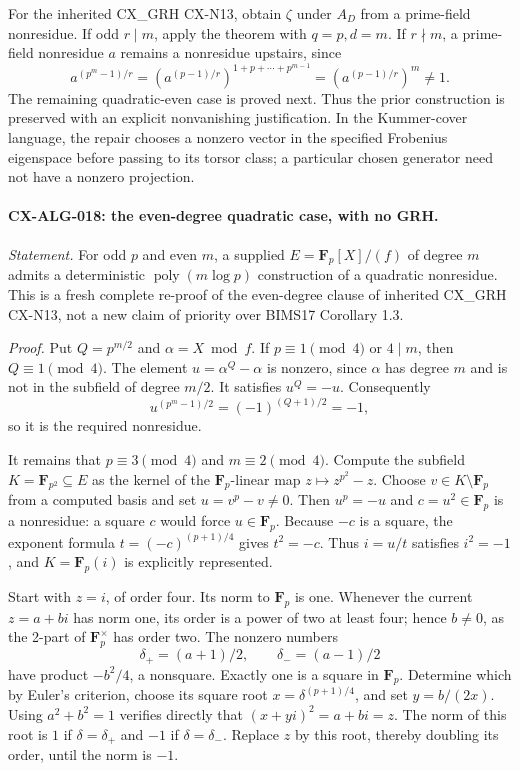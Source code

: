 \documentclass[11pt,a4paper]{article}
\begin{document}
For the inherited CX\_GRH CX-N13, obtain $\zeta$ under $A_D$ from a
prime-field nonresidue. If odd $r\mid m$, apply the theorem with
$q=p,d=m$. If $r\nmid m$, a prime-field nonresidue $a$ remains a
nonresidue upstairs, since
\[
 a^{(p^m-1)/r}
   =\left(a^{(p-1)/r}\right)^{1+p+\cdots+p^{m-1}}
   =\left(a^{(p-1)/r}\right)^m\ne1.
\]
The remaining quadratic-even case is proved next. Thus the prior
construction is preserved with an explicit nonvanishing justification.
In the Kummer-cover language, the repair chooses a nonzero vector in the
specified Frobenius eigenspace before passing to its torsor class; a
particular chosen generator need not have a nonzero projection.

\paragraph{CX-ALG-018: the even-degree quadratic case, with no GRH.}
\emph{Statement.} For odd $p$ and even $m$, a supplied
$E=\mathbf F_p[X]/(f)$ of degree $m$ admits a deterministic
$\operatorname{poly}(m\log p)$ construction of a quadratic nonresidue.
This is a fresh complete re-proof of the even-degree clause of inherited
CX\_GRH CX-N13, not a new claim of priority over BIMS17 Corollary 1.3.

\emph{Proof.} Put $Q=p^{m/2}$ and $\alpha=X\bmod f$.
If $p\equiv1\pmod4$ or $4\mid m$, then $Q\equiv1\pmod4$.
The element $u=\alpha^Q-\alpha$ is nonzero, since $\alpha$ has degree
$m$ and is not in the subfield of degree $m/2$. It satisfies $u^Q=-u$.
Consequently
\[
       u^{(p^m-1)/2}=(-1)^{(Q+1)/2}=-1,
\]
so it is the required nonresidue.

It remains that $p\equiv3\pmod4$ and $m\equiv2\pmod4$.
Compute the subfield $K=\mathbf F_{p^2}\subseteq E$ as the kernel of
the $\mathbf F_p$-linear map $z\mapsto z^{p^2}-z$.
Choose $v\in K\setminus\mathbf F_p$ from a computed basis and set
$u=v^p-v\ne0$. Then $u^p=-u$ and $c=u^2\in\mathbf F_p$ is a
nonresidue: a square $c$ would force $u\in\mathbf F_p$.
Because $-c$ is a square, the exponent formula
$t=(-c)^{(p+1)/4}$ gives $t^2=-c$. Thus $i=u/t$ satisfies $i^2=-1$,
and $K=\mathbf F_p(i)$ is explicitly represented.

Start with $z=i$, of order four. Its norm to $\mathbf F_p$ is one.
Whenever the current $z=a+bi$ has norm one, its order is a power of two
at least four; hence $b\ne0$, as the 2-part of $\mathbf F_p^\times$ has
order two. The nonzero numbers
\[
                 \delta_+=(a+1)/2,\qquad \delta_-=(a-1)/2
\]
have product $-b^2/4$, a nonsquare. Exactly one is a square in
$\mathbf F_p$. Determine which by Euler's criterion, choose its square
root $x=\delta^{(p+1)/4}$, and set $y=b/(2x)$.
Using $a^2+b^2=1$ verifies directly that
$(x+yi)^2=a+bi=z$. The norm of this root is $1$ if
$\delta=\delta_+$ and $-1$ if $\delta=\delta_-$.
Replace $z$ by this root, thereby doubling its order, until the norm is
$-1$.
\end{document}
